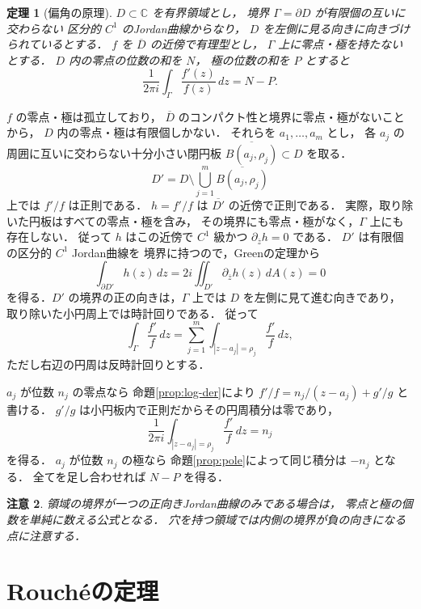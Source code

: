 \documentclass[a5paper,10pt,onecolumn]{jsarticle}
\makeatletter
\theoremstyle{mathnotetheorem}
\newtheorem{theorem}{定理}[section]
\newtheorem{remark}[theorem]{注意}
\renewcommand{\proofname}{証明}
\renewenvironment{proof}[1][\proofname]{%
  \par\pushQED{\qed}\normalfont\topsep4\p@\@plus2\p@\relax
  \trivlist\item[\hskip\labelsep\bfseries #1]\ignorespaces
}{\popQED\endtrivlist\@endpefalse}
\makeatother
\begin{document}
\begin{theorem}[偏角の原理]\label{thm:argument}
$D\subset\mathbb C$ を有界領域とし，
境界 $\Gamma=\partial D$ が有限個の互いに交わらない
区分的 $C^1$ のJordan曲線からなり，
$D$ を左側に見る向きに向きづけられているとする．
$f$ を $\overline D$ の近傍で有理型とし，
$\Gamma$ 上に零点・極を持たないとする．
$D$ 内の零点の位数の和を $N$，
極の位数の和を $P$ とすると
\[
 \frac1{2\pi i}\int_\Gamma\frac{f'(z)}{f(z)}\,dz
 =N-P.
\]
\end{theorem}
\begin{proof}
$f$ の零点・極は孤立しており，
$\overline D$ のコンパクト性と境界に零点・極がないことから，
$D$ 内の零点・極は有限個しかない．
それらを $a_1,\dots,a_m$ とし，
各 $a_j$ の周囲に互いに交わらない十分小さい閉円板
$\overline{B(a_j,\rho_j)}\subset D$ を取る．
\[
 D'=D\setminus\bigcup_{j=1}^m\overline{B(a_j,\rho_j)}
\]
上では $f'/f$ は正則である．
$h=f'/f$ は $\overline{D'}$ の近傍で正則である．
実際，取り除いた円板はすべての零点・極を含み，
その境界にも零点・極がなく，$\Gamma$ 上にも存在しない．
従って $h$ はこの近傍で $C^1$ 級かつ
$\partial_{\overline z}h=0$ である．
$D'$ は有限個の区分的 $C^1$ Jordan曲線を
境界に持つので，Greenの定理から
\[
 \int_{\partial D'}h(z)\,dz
 =2i\iint_{D'}\partial_{\overline z}h(z)\,dA(z)
 =0
\]
を得る．$D'$ の境界の正の向きは，$\Gamma$ 上では
$D$ を左側に見て進む向きであり，
取り除いた小円周上では時計回りである．
従って
\[
 \int_\Gamma\frac{f'}f\,dz
 =\sum_{j=1}^m\int_{|z-a_j|=\rho_j}\frac{f'}f\,dz,
\]
ただし右辺の円周は反時計回りとする．

$a_j$ が位数 $n_j$ の零点なら
命題\ref{prop:log-der}により
$f'/f=n_j/(z-a_j)+g'/g$ と書ける．
$g'/g$ は小円板内で正則だからその円周積分は零であり，
\[
 \frac1{2\pi i}\int_{|z-a_j|=\rho_j}\frac{f'}f\,dz=n_j
\]
を得る．
$a_j$ が位数 $n_j$ の極なら
命題\ref{prop:pole}によって同じ積分は $-n_j$ となる．
全てを足し合わせれば $N-P$ を得る．
\end{proof}

\begin{remark}
領域の境界が一つの正向きJordan曲線のみである場合は，
零点と極の個数を単純に数える公式となる．
穴を持つ領域では内側の境界が負の向きになる点に注意する．
\end{remark}

\section{Rouch\'eの定理}
\end{document}
